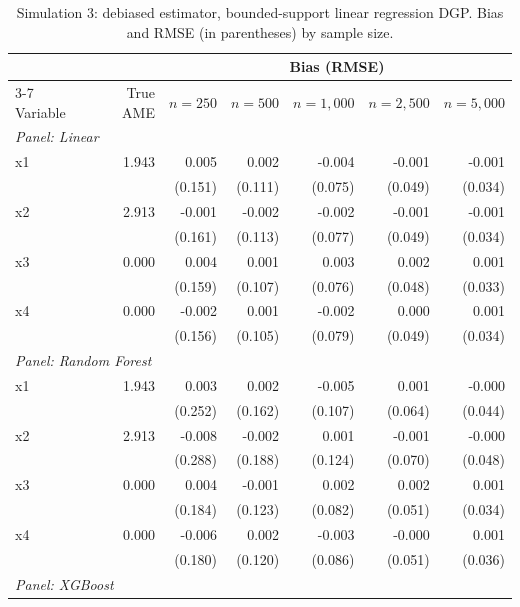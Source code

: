 \documentclass[12pt]{article}
\begin{document}
	\begin{table}[htbp]
		\centering
		\small
		\begin{threeparttable}
			\caption{Simulation 3: debiased estimator, bounded-support linear regression DGP. Bias and RMSE (in parentheses) by sample size.}
			\label{tab:sim3_bias_regression_linear_uniform}
			\begin{tabular}{lrrrrrr}
				\toprule
				& & \multicolumn{5}{c}{Bias (RMSE)} \\
				\cmidrule(lr){3-7}
				Variable & True AME & $n=250$ & $n=500$ & $n=1,000$ & $n=2,500$ & $n=5,000$ \\
				\midrule
				\multicolumn{7}{l}{\textit{Panel: Linear}} \\
				\quad x1 & 1.943 & 0.005 & 0.002 & -0.004 & -0.001 & -0.001 \\
				&  & (0.151) & (0.111) & (0.075) & (0.049) & (0.034) \\
				\quad x2 & 2.913 & -0.001 & -0.002 & -0.002 & -0.001 & -0.001 \\
				&  & (0.161) & (0.113) & (0.077) & (0.049) & (0.034) \\
				\quad x3 & 0.000 & 0.004 & 0.001 & 0.003 & 0.002 & 0.001 \\
				&  & (0.159) & (0.107) & (0.076) & (0.048) & (0.033) \\
				\quad x4 & 0.000 & -0.002 & 0.001 & -0.002 & 0.000 & 0.001 \\
				&  & (0.156) & (0.105) & (0.079) & (0.049) & (0.034) \\
				\midrule
				\multicolumn{7}{l}{\textit{Panel: Random Forest}} \\
				\quad x1 & 1.943 & 0.003 & 0.002 & -0.005 & 0.001 & -0.000 \\
				&  & (0.252) & (0.162) & (0.107) & (0.064) & (0.044) \\
				\quad x2 & 2.913 & -0.008 & -0.002 & 0.001 & -0.001 & -0.000 \\
				&  & (0.288) & (0.188) & (0.124) & (0.070) & (0.048) \\
				\quad x3 & 0.000 & 0.004 & -0.001 & 0.002 & 0.002 & 0.001 \\
				&  & (0.184) & (0.123) & (0.082) & (0.051) & (0.034) \\
				\quad x4 & 0.000 & -0.006 & 0.002 & -0.003 & -0.000 & 0.001 \\
				&  & (0.180) & (0.120) & (0.086) & (0.051) & (0.036) \\
				\midrule
				\multicolumn{7}{l}{\textit{Panel: XGBoost}} \\

\end{tabular}
\end{threeparttable}
\end{table}
\end{document}
